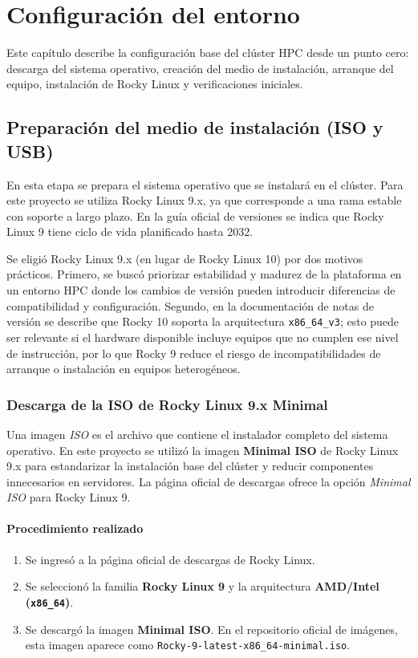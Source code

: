 \chapter{Configuración del entorno}
\label{chap:config_entorno}

Este capítulo describe la configuración base del clúster HPC desde un punto cero: descarga del sistema operativo, creación del medio de instalación, arranque del equipo, instalación de Rocky Linux y verificaciones iniciales.

\section{Preparación del medio de instalación (ISO y USB)}
\label{sec:iso_usb}

En esta etapa se prepara el sistema operativo que se instalará en el clúster. Para este proyecto se utiliza Rocky Linux 9.x, ya que corresponde a una rama estable con soporte a largo plazo. En la guía oficial de versiones se indica que Rocky Linux 9 tiene ciclo de vida planificado hasta 2032. \cite{rocky_version_guide}

Se eligió Rocky Linux 9.x (en lugar de Rocky Linux 10) por dos motivos prácticos. Primero, se buscó priorizar estabilidad y madurez de la plataforma en un entorno HPC donde los cambios de versión pueden introducir diferencias de compatibilidad y configuración. Segundo, en la documentación de notas de versión se describe que Rocky 10 soporta la arquitectura \texttt{x86\_64\_v3}; esto puede ser relevante si el hardware disponible incluye equipos que no cumplen ese nivel de instrucción, por lo que Rocky 9 reduce el riesgo de incompatibilidades de arranque o instalación en equipos heterogéneos. \cite{rocky_version_guide,rocky_release_notes}

\subsection{Descarga de la ISO de Rocky Linux 9.x Minimal}
Una imagen \textit{ISO} es el archivo que contiene el instalador completo del sistema operativo. En este proyecto se utilizó la imagen \textbf{Minimal ISO} de Rocky Linux 9.x para estandarizar la instalación base del clúster y reducir componentes innecesarios en servidores. La página oficial de descargas ofrece la opción \textit{Minimal ISO} para Rocky Linux 9. \cite{rocky_download}

\subsubsection*{Procedimiento realizado}
\begin{enumerate}
  \item Se ingresó a la página oficial de descargas de Rocky Linux.
  \item Se seleccionó la familia \textbf{Rocky Linux 9} y la arquitectura \textbf{AMD/Intel (\texttt{x86\_64})}.
  \item Se descargó la imagen \textbf{Minimal ISO}. En el repositorio oficial de imágenes, esta imagen aparece como \texttt{Rocky-9-latest-x86\_64-minimal.iso}. \cite{rocky_9_isos}
\end{enumerate}

